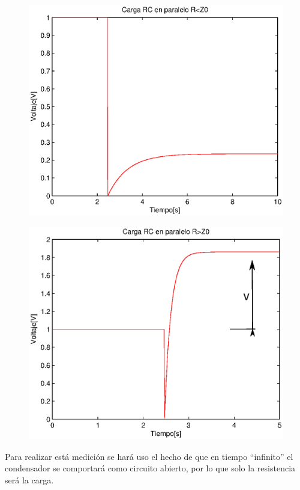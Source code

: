 \documentclass[11pt,onecolumn]{article}
\begin{document}
\begin{figure}[H]
\centering
\includegraphics[scale=0.6]{img/RC_paralelo_rme0.eps}
\label{}
\end{figure}

\begin{figure}[H]
\centering
\includegraphics[scale=0.6]{img/RC_paralelo_rma0.eps}
\label{}
\end{figure}

Para realizar está medición se hará uso el hecho de que en tiempo  ``infinito'' el condensador se comportará como circuito abierto, por lo que solo la resistencia será la carga.
\end{document}
